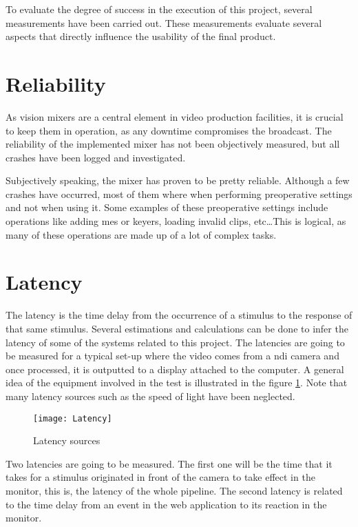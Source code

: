 \documentclass[../main.tex]{subfiles}
\begin{document}
\label{chap:results}

To evaluate the degree of success in the execution of this project, several measurements have been carried out. These measurements evaluate several aspects that directly influence the usability of the final product.\newline

\section{Reliability}
As vision mixers are a central element in video production facilities, it is crucial to keep them in operation, as any downtime compromises the broadcast. The reliability of the implemented mixer has not been objectively measured, but all crashes have been logged and investigated.\newline

Subjectively speaking, the mixer has proven to be pretty reliable. Although a few crashes have occurred, most of them where when performing preoperative settings and not when using it. Some examples of these preoperative settings include operations like adding \glspl{me} or keyers, loading invalid clips, etc\dots This is logical, as many of these operations are made up of a lot of complex tasks.\newline


\section{Latency}
The latency is the time delay from the occurrence of a stimulus to the response of that same stimulus. Several estimations and calculations can be done to infer the latency of some of the systems related to this project. The latencies are going to be measured for a typical set-up where the video comes from a \gls{ndi} camera and once processed, it is outputted to a display attached to the computer. A general idea of the equipment involved in the test is illustrated in the figure \ref{fig:05:latency_sources}. Note that many latency sources such as the speed of light have been neglected.\newline

\begin{figure}[htbp]
    \centering
    \texttt{[image: Latency]}
    \caption{Latency sources}
    \label{fig:05:latency_sources}
\end{figure}

Two latencies are going to be measured. The first one will be the time that it takes for a stimulus originated in front of the camera to take effect in the monitor, this is, the latency of the whole pipeline. The second latency is related to the time delay from an event in the web application to its reaction in the monitor.\newline
\end{document}
